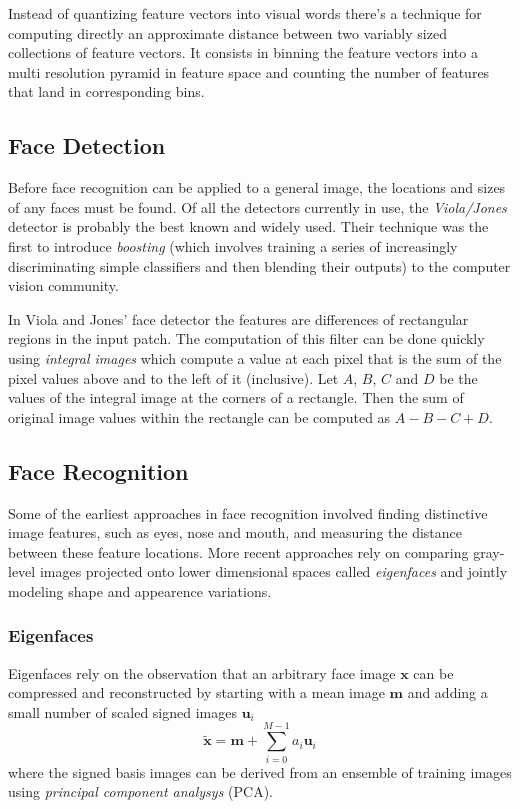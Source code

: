 \documentclass[a4paper,twocolumn]{article}
\begin{document}
Instead of quantizing feature vectors into visual words there's a technique for
computing directly an approximate distance between two variably sized
collections of feature vectors. It consists in binning the feature vectors into
a multi resolution pyramid in feature space and counting the number of features
that land in corresponding bins.

\subsection{Face Detection}
Before face recognition can be applied to a general image, the locations and
sizes of any faces must be found. Of all the detectors currently in use, the
\textit{Viola/Jones} detector is probably the best known and widely used. Their
technique was the first to introduce \textit{boosting} (which involves training
a series of increasingly discriminating simple classifiers and then blending
their outputs) to the computer vision community.

In Viola and Jones' face detector the features are differences of rectangular
regions in the input patch. The computation of this filter can be done quickly
using \textit{integral images} which compute a value at each pixel that is the
sum of the pixel values above and to the left of it (inclusive). Let $A$,
$B$, $C$ and $D$ be the values of the integral image at the corners of a
rectangle. Then the sum of original image values within the rectangle can be
computed as $A - B - C + D$.

\subsection{Face Recognition}
Some of the earliest approaches in face recognition involved finding distinctive
image features, such as eyes, nose and mouth, and measuring the distance between
these feature locations. More recent approaches rely on comparing gray-level
images projected onto lower dimensional spaces called \textit{eigenfaces} and
jointly modeling shape and appearence variations.

\subsubsection{Eigenfaces}
Eigenfaces rely on the observation that an arbitrary face image
$\mathbf{x}$ can be compressed and reconstructed by starting with a mean image
$\mathbf{m}$ and adding a small number of scaled signed images $\mathbf{u}_i$
\begin{equation} \label{eq:eigenfaces-compression}
	\tilde{\mathbf{x}}=\mathbf{m}+\sum_{i=0}^{M-1}a_i\mathbf{u}_i
\end{equation}
where the signed basis images can be derived from an ensemble of training images
using \textit{principal component analysys} (PCA).
\end{document}
